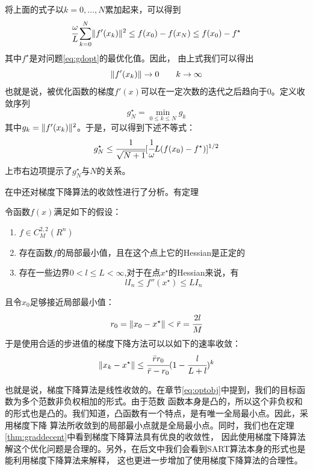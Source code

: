 将上面的式子以$k=0,\hdots,N$累加起来，可以得到
\begin{equation}
\cfrac{\omega}{L}\sum^N_{k=0}\lVert f'(x_k)\rVert^2\le f(x_0)-f(x_N)
\le f(x_0)-f^\star
\end{equation}
其中$f^\star$是对问题\eqref{eq:gdopt}的最优化值。因此，
由上式我们可以得出
\begin{equation*}
\lVert f'(x_k)\rVert\rightarrow 0 \qquad k\rightarrow \infty
\end{equation*}
也就是说，被优化函数的梯度$f'(x)$可以在一定次数的迭代之后趋向于$0$。定义收敛序列
\begin{equation*}
g^\star_N=\min_{0\le k\le N}g_k
\end{equation*}
其中$g_k=\lVert f'(x_k)\rVert^2$。于是，可以得到下述不等式：
\begin{equation}
g^\star_N \le \cfrac{1}{\sqrt{N+1}}[\cfrac{1}{\omega}L(f(x_0)-f^\star)]^{1/2}
\end{equation}
上市右边项提示了$g^\star_N$与$N$的关系。

在\cite{nesterov2003}中还对梯度下降算法的收敛性进行了分析。有定理
\begin{thm}\label{thm:graddecent}
令函数$f(x)$满足如下的假设：
\begin{enumerate}
\item{$f\in C^{2,2}_M(R^n)$}
\item{存在函数$f$的局部最小值，且在这个点上它的Hessian是正定的}
\item{存在一些边界$0<l\le L<\infty$,对于在点$x^\star$的Hessian来说，有
\begin{equation*}
lI_n\le f''(x^\star)\le LI_n
\end{equation*}}
\end{enumerate}
且令$x_0$足够接近局部最小值：
\begin{equation*}
r_0=\lVert x_0-x^\star\rVert<\bar{r}=\cfrac{2l}{M}
\end{equation*}
于是使用合适的步进值的梯度下降方法可以以如下的速率收敛：
\begin{equation*}
\lVert x_k-x^\star\rVert\le \cfrac{\bar{r}r_0}{\bar{r}-r_0}(1-\cfrac{l}{L+l})^k
\end{equation*}
\end{thm}
也就是说，梯度下降算法是线性收敛的。在章节\ref{eq:optobj}中提到，我们的目标函数为多个范数非负权相加的形式。由于范数
函数本身是凸的，所以这个非负权和的形式也是凸的。我们知道，凸函数有一个特点，是有唯一全局最小点。因此，采用梯度下降
算法所收敛到的局部最小点就是全局最小点。同时，我们也在定理\ref{thm:graddecent}中看到梯度下降算法具有优良的收敛性，
因此使用梯度下降算法解这个优化问题是合理的。另外，在后文中我们会看到SART算法本身的形式也是能利用梯度下降算法来解释，
这也更进一步增加了使用梯度下降算法的合理性。
